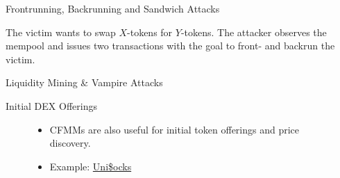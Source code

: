 \documentclass[handout]{beamer}
\begin{document}
\begin{frame}{Frontrunning, Backrunning and Sandwich Attacks}

\small{The victim wants to swap $X$-tokens for $Y$-tokens. The attacker observes the mempool and issues two transactions with the goal to front- and backrun the victim.}

\end{frame}


\begin{frame}{Liquidity Mining \& Vampire Attacks}
	\begin{figure}[h!]
		\begin{center}
			
		\end{center}
	\end{figure}
\end{frame}


\begin{frame}{Initial DEX Offerings}

	\begin{figure}
		\begin{minipage}[c]{0.3\textwidth}
			
		\end{minipage}
		\hfill
		\begin{minipage}[c]{0.5\textwidth}
			\begin{itemize}
				\item CFMMs are also useful for initial token offerings and price discovery.
				\item Example: \href{https://unisocks.exchange/}{Uni\$ocks} \link
			\end{itemize}
		\end{minipage}
	\end{figure}

\end{frame}
\end{document}
